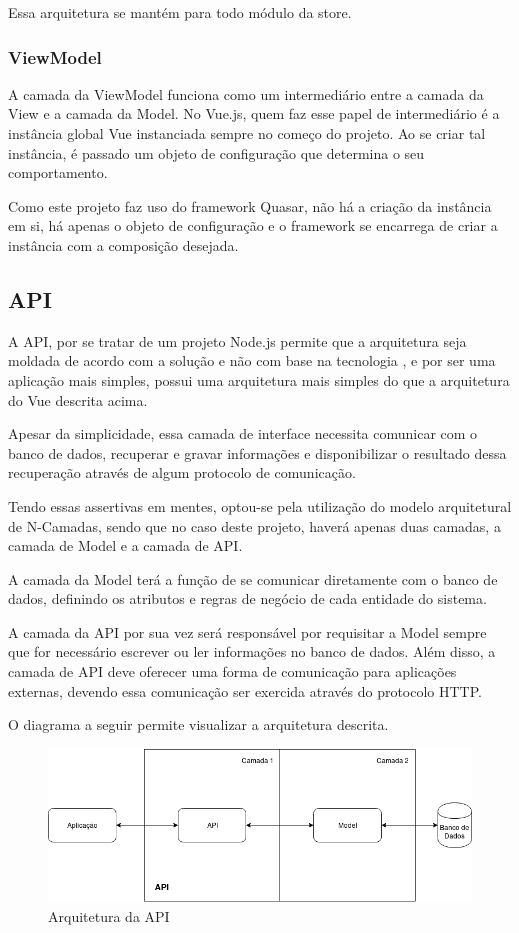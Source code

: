 \begin{apendicesenv}
Essa arquitetura se mantém para todo módulo da store. \cite{vuex}

\subsubsection{ViewModel}
A camada da ViewModel funciona como um intermediário entre a camada da View e a camada da Model. No Vue.js, quem faz esse papel de intermediário é a instância global Vue instanciada sempre no começo do projeto. Ao se criar tal instância, é passado um objeto de configuração que determina o seu comportamento.

Como este projeto faz uso do framework Quasar, não há a criação da instância em si, há apenas o objeto de configuração e o framework se encarrega de criar a instância com a composição desejada.\cite{vuejs}

\subsection{API}
A API, por se tratar de um projeto Node.js permite que a arquitetura seja moldada de acordo com a solução e não com base na tecnologia \cite{nodejs}, e por ser uma aplicação mais simples, possui uma arquitetura mais simples do que a arquitetura do Vue descrita acima. 

Apesar da simplicidade, essa camada de interface necessita comunicar com o banco de dados, recuperar e gravar informações e disponibilizar o resultado dessa recuperação através de algum protocolo de comunicação. 

Tendo essas assertivas em mentes, optou-se pela utilização do modelo arquitetural de N-Camadas, sendo que no caso deste projeto, haverá apenas duas camadas, a camada de Model e a camada de API.

A camada da Model terá a função de se comunicar diretamente com o banco de dados, definindo os atributos e regras de negócio de cada entidade do sistema.

A camada da API por sua vez será responsável por requisitar a Model sempre que for necessário escrever ou ler informações no banco de dados. Além disso, a camada de API deve oferecer uma forma de comunicação para aplicações externas, devendo essa comunicação ser exercida através do protocolo HTTP.

O diagrama a seguir permite visualizar a arquitetura descrita.

\begin{figure}[!ht]
	\centering
		\includegraphics[scale=0.5]{figuras/software/8-api-arquitetura.png}
	\caption{Arquitetura da API}
\end{figure}


\end{apendicesenv}
